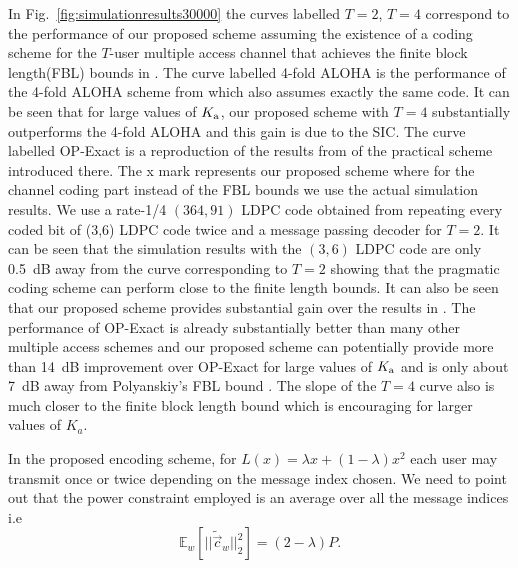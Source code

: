 In Fig.~\ref{fig:simulationresults30000} the curves labelled $T=2$, $T=4$ correspond to the performance of our proposed scheme assuming the existence of a coding scheme for the $T$-user multiple access channel that achieves the finite block length(FBL) bounds in \cite{polyanskiy2017perspective}. The curve labelled 4-fold ALOHA is the performance of the 4-fold ALOHA scheme from \cite{ordentlich2017low} which also assumes exactly the same code. It can be seen that for large values of $K_{\text{a}}$, our proposed scheme with $T=4$ substantially outperforms the 4-fold ALOHA and this gain is due to the SIC. The curve labelled OP-Exact is a reproduction of the results from \cite{ordentlich2017low} of the practical scheme introduced there. The x mark represents our proposed scheme where for the channel coding part instead of the FBL bounds we use the actual simulation results. We use a rate-1/4 $(364,91)$ LDPC code obtained from repeating every coded bit of (3,6) LDPC code twice and a message passing decoder for $T=2$. It can be seen that the simulation results with the $(3,6)$ LDPC code are only 0.5~dB away from the curve corresponding to $T=2$ showing that the pragmatic coding scheme can perform close to the finite length bounds. It can also be seen that our proposed scheme provides substantial gain over the results in \cite{ordentlich2017low}. The performance of OP-Exact is already substantially better than many other multiple access schemes and our proposed scheme can potentially provide more than 14~dB improvement over OP-Exact for large values of $K_{\text{a}}$ and is only about 7~dB away from Polyanskiy's FBL bound \cite{polyanskiy2017perspective}. The slope of the $T=4$ curve also is much closer to the finite block length bound which is encouraging for larger values of $K_a$. 


 In the proposed encoding scheme, for $L(x)=\lambda x+(1-\lambda)x^2$ each user may transmit once or twice depending on the message index chosen. We need to point out that the power constraint employed is an average over all the message indices i.e
\[
\mathbb{E}_{w}\left[||\tilde{\vec{c}}_w||_2^2\right]=(2-\lambda)P.
\]


